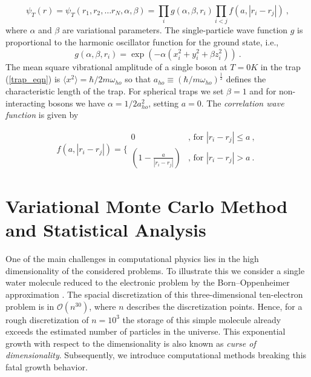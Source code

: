 \documentclass[11pt,a4paper]{article}
\numberwithin{equation}{section}
\begin{document}
\begin{equation}
\psi_T({r})=\psi_T({r}_1, {r}_2, \dots {r}_N,\alpha,\beta)=\prod_i g(\alpha,\beta,{r}_i)\prod_{i<j}f(a,|{r}_i-{r}_j|)~,
\label{eq:trialwf}
\end{equation}
where $\alpha$ and $\beta$ are variational parameters. 
%
The single-particle wave function $g$ is proportional to the harmonic oscillator function for the ground state, i.e.,
\begin{equation}
g(\alpha,\beta,{r}_i)= \exp(-\alpha(x_i^2+y_i^2+\beta z_i^2))~.
\end{equation}
The mean square vibrational amplitude of a single boson at $T=0K$ in the trap (\ref{trap_eqn}) is $\langle x^2\rangle=\hbar/2m\omega_{ho}$ so that $a_{ho} \equiv (\hbar/m\omega_{ho})^{\frac{1}{2}}$ defines the characteristic length of the trap.  
%
For spherical traps we set $\beta = 1$ and for non-interacting bosons we have $\alpha = 1/2a_{ho}^2$, setting $a = 0$.
%
%
The {\it correlation wave function} is given by

\begin{equation}
f(a,|{r}_i-{r}_j|)=\Bigg\{
\begin{array}{ll}
0 & \text{, for }{|{r}_i-{r}_j|} \leq {a}~,\\
(1-\frac{a}{|{r}_i-{r}_j|}) & \text{, for }{|{r}_i-{r}_j|} > {a}~.
\end{array}
\end{equation}




\section{Variational Monte Carlo Method and Statistical Analysis}
%
%
%
One of the main challenges in computational physics lies in the high dimensionality of the considered problems. 
%
To illustrate this we consider a single water molecule reduced to the electronic problem by the Born--Oppenheimer approximation \cite{slater1964quantum,born1927quantentheorie}.
%
The spacial discretization of this three-dimensional ten-electron problem is in $\mathcal{O}(n^{30})$, where $n$ describes the discretization points. 
%
Hence, for a rough discretization of $n=10^3$ the storage of this simple molecule already exceeds the estimated number of particles in the universe. 
%
This exponential growth with respect to the dimensionality is also known as \textit{curse of dimensionality}. 
%
Subsequently, we introduce computational methods breaking this fatal growth behavior. 
\end{document}
